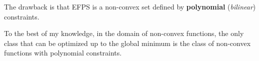 The drawback is that EFPS is a non-convex set defined by \textbf{polynomial} (\textit{bilinear}) constraints.

\begin{factbox}
To the best of my knowledge, in the domain of non-convex functions, the only class that can be optimized up to the global minimum is the class of non-convex functions with polynomial constraints.
\end{factbox}

